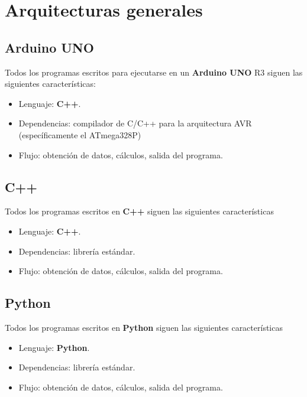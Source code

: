 %
\section{Arquitecturas generales}

\subsection{Arduino UNO}
\label{sec:genarc:arduino}

Todos los programas escritos para ejecutarse en un \textbf{Arduino UNO} R3 siguen las siguientes características:

\begin{itemize}
  \item Lenguaje: \textbf{C++}.
  \item Dependencias: compilador de C/C++ para la arquitectura AVR (específicamente el ATmega328P)
  \item Flujo: obtención de datos, cálculos, salida del programa.
\end{itemize}

\subsection{C++}
\label{sec:genarc:cplusplus}

Todos los programas escritos en \textbf{C++} siguen las siguientes características

\begin{itemize}
  \item Lenguaje: \textbf{C++}.
  \item Dependencias: librería estándar.
  \item Flujo: obtención de datos, cálculos, salida del programa.
\end{itemize}

\subsection{Python}
\label{sec:genarc:python}

Todos los programas escritos en \textbf{Python} siguen las siguientes características

\begin{itemize}
  \item Lenguaje: \textbf{Python}.
  \item Dependencias: librería estándar.
  \item Flujo: obtención de datos, cálculos, salida del programa.
\end{itemize}